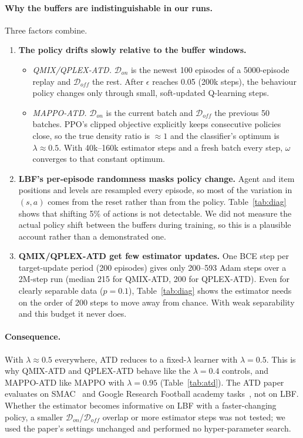 \paragraph{Why the buffers are indistinguishable in our runs.} Three factors combine.
\begin{enumerate}
  \item \textbf{The policy drifts slowly relative to the buffer windows.}
        \begin{itemize}
          \item \emph{QMIX/QPLEX-ATD.} $\mathcal{D}_{on}$ is the newest 100 episodes of a
                5000-episode replay and $\mathcal{D}_{off}$ the rest. After $\epsilon$ reaches
                0.05 (200k steps), the behaviour policy changes only through small, soft-updated
                Q-learning steps.
          \item \emph{MAPPO-ATD.} $\mathcal{D}_{on}$ is the current batch and $\mathcal{D}_{off}$
                the previous 50 batches. PPO's clipped objective explicitly keeps consecutive
                policies close, so the true density ratio is $\approx1$ and the classifier's
                optimum is $\lambda\approx0.5$. With 40k--160k estimator steps and a fresh
                batch every step, $\omega$ converges to that constant optimum.
        \end{itemize}
  \item \textbf{LBF's per-episode randomness masks policy change.} Agent and item positions and
        levels are resampled every episode, so most of the variation in $(s,a)$ comes from the
        reset rather than from the policy. Table~\ref{tab:diag} shows that shifting 5\% of
        actions is not detectable. We did not measure the actual policy shift between the
        buffers during training, so this is a plausible account rather than a demonstrated one.
  \item \textbf{QMIX/QPLEX-ATD get few estimator updates.} One BCE step per target-update period
        (200 episodes) gives only 200--593 Adam steps over a 2M-step run (median 215 for QMIX-ATD,
        200 for QPLEX-ATD). Even for clearly separable data ($p=0.1$), Table~\ref{tab:diag} shows
        the estimator needs on the order of 200 steps to move away from chance. With weak
        separability and this budget it never does.
\end{enumerate}

\paragraph{Consequence.} With $\lambda\approx0.5$ everywhere, ATD reduces to a fixed-$\lambda$
learner with $\lambda=0.5$. This is why QMIX-ATD and QPLEX-ATD behave like the $\lambda=0.4$
controls, and MAPPO-ATD like MAPPO with $\lambda=0.95$ (Table~\ref{tab:atd}). The ATD paper
evaluates on SMAC~\citep{samvelyan2019smac} and Google Research Football academy
tasks~\citep{kurach2020grf,deng2026adaptive}, not on LBF.
Whether the estimator becomes informative on LBF with a faster-changing policy, a smaller
$\mathcal{D}_{on}$/$\mathcal{D}_{off}$ overlap or more estimator steps was not tested; we used
the paper's settings unchanged and performed no hyper-parameter search.

